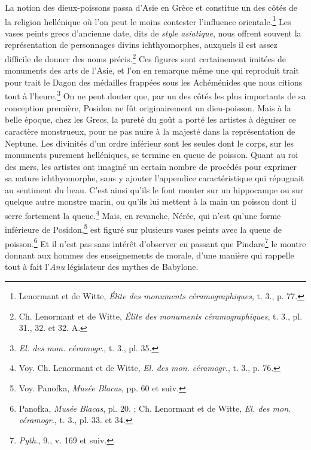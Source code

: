 \documentclass[a4paper, 11pt, oneside]{article}
\begin{document}
La notion des dieux-poissons passa d'Asie en Grèce et constitue un des côtés de la religion hellénique où l'on peut le moins contester l'influence orientale.\footnote{Lenormant et de Witte, \emph{Élite des monuments céramographiques}, t. 3., p. 77.} Les vases peints grecs d'ancienne date, dits de \emph{style asiatique}, nous offrent souvent la représentation de personnages divins ichthyomorphes, auxquels il est assez difficile de donner des noms précis.\footnote{Ch. Lenormant et de Witte, \emph{Élite des monuments céramographiques}, t. 3., pl. 31., 32. et 32. A.} Ces figures sont certainement imitées de monuments des arts de l'Asie, et l'on en remarque même une qui reproduit trait pour trait le Dagon des médailles frappées sous les Achéménides que nous citions tout à l'heure.\footnote{\emph{El. des mon. céramogr.}, t. 3., pl. 35.} On ne peut douter que, par un des côtés les plus importants de sa conception première, Posidon ne fût originairement un dieu-poisson. Mais à la belle époque, chez les Grecs, la pureté du goût a porté les artistes à déguiser ce caractère monstrueux, pour ne pas nuire à la majesté dans la représentation de Neptune. Les divinités d'un ordre inférieur sont les seules dont le corps, sur les monuments purement helléniques, se termine en queue de poisson. Quant au roi des mers, les artistes ont imaginé un certain nombre de procédés pour exprimer sa nature ichthyomorphe, sans y ajouter l'appendice caractéristique qui répugnait au sentiment du beau. C'est ainsi qu'ils le font monter sur un hippocampe ou sur quelque autre monstre marin, ou qu'ils lui mettent à la main un poisson dont il serre fortement la queue.\footnote{Voy. Ch. Lenormant et de Witte, \emph{El. des mon. céramogr.}, t. 3., p. 76.} Mais, en revanche, Nérée, qui n'est qu'une forme inférieure de Posidon,\footnote{Voy. Panofka, \emph{Musée Blacas}, pp. 60 et suiv.} est figuré sur plusieurs vases peints avec la queue de poisson.\footnote{Panofka, \emph{Musée Blacas}, pl. 20. ; Ch. Lenormant et de Witte, \emph{El. des mon. céramogr.}, t. 3., pl. 33. et 34.} Et il n'est pas sans intérêt d'observer en passant que Pindare\footnote{\emph{Pyth}., 9., v. 169 et suiv.} le montre donnant aux hommes des enseignements de morale, d'une manière qui rappelle tout à fait l'\emph{Anu} législateur des mythes de Babylone.
\end{document}
